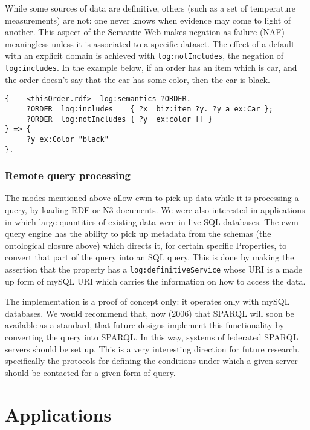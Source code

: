 \documentclass{tlp}
\begin{document}
\par While some sources of data are definitive, others
(such as a set of temperature measurements) are not: one never
knows when evidence may come to light of another. This aspect of
the Semantic Web makes negation as failure (NAF) meaningless unless
it is associated to a specific dataset. The effect of a default
with an explicit domain is achieved with
{\tt log:notIncludes}, the negation of
{\tt log:includes}. In the example below, if an order has an
item which is car, and the order doesn't say that the car has some
color, then the car is black.
\begin{verbatim}
{    <thisOrder.rdf>  log:semantics ?ORDER.
     ?ORDER  log:includes    { ?x  biz:item ?y. ?y a ex:Car };
     ?ORDER  log:notIncludes { ?y  ex:color [] }
} => {
     ?y ex:Color "black"
}.
\end{verbatim}
\subsubsection{Remote query processing}
  

\par The modes mentioned above allow cwm to pick up data while it is
processing a query, by loading RDF or N3 documents. We were also
interested in applications in which large quantities of existing
data were in live SQL databases. The cwm query engine has the
ability to pick up metadata from the schemas (the ontological
closure above) which directs it, for certain specific Properties,
to convert that part of the query into an SQL query. This is done
by making the assertion that the property has a
{\tt log:definitiveService} whose URI is a made up form of
mySQL URI which carries the information on how to access the
data.

\par The implementation is a proof of concept only: it operates only
with mySQL databases. We would recommend that, now (2006) that
SPARQL will soon be available as a standard, that future designs
implement this functionality by converting the query into SPARQL.
In this way, systems of federated SPARQL servers should be set up.
This is a very interesting direction for future research,
specifically the protocols for defining the conditions under which
a given server should be contacted for a given form of query.
\section{Applications}
  
\end{document}
